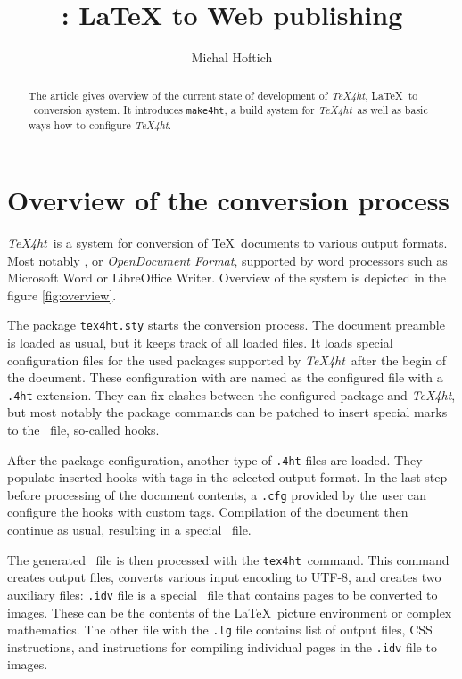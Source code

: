 \documentclass{ltugproc}
\author{Michal Hoftich}
\title{\texfourht: LaTeX to Web publishing}
\newcommand\term[1]{\textit{#1}}
\newcommand\command[1]{\texttt{#1}}
\newcommand\packagename[1]{\texttt{#1\-.sty}}
\newcommand\texfourht{\term{\TeX\-4ht}}
\newcommand\texfourhtcmd{\command{tex4ht}}
\newcommand\makefourht{\command{make4ht}}
\newcommand\extension[1]{\texttt{.#1}}
\begin{document}
\begin{abstract}
  The article gives overview of the current state of development of \texfourht,
  \LaTeX\ to \XML\ conversion system. It introduces \makefourht, a build system for
  \texfourht\ as well as basic ways how to configure \texfourht.
\end{abstract}
\maketitle

\section{Overview of the conversion process}
\texfourht\ is a system for conversion of \TeX\ documents to various output
formats. Most notably \HTML, or \term{OpenDocument Format}, supported by word processors such as Microsoft Word or LibreOffice
Writer. Overview of the system is depicted in the figure \ref{fig:overview}.


The package \packagename{tex4ht} starts the conversion process. The document
preamble is loaded as usual, but it keeps track of all loaded files. 
It loads special configuration files for the
used packages supported by \texfourht\ after the begin of the document.
These configuration with are named as the configured file with a
\extension{4ht} extension.  They can fix clashes between the configured package
and \texfourht, but most notably the package commands can be patched to insert
special marks to the \DVI\ file, so-called
hooks. 

After the package configuration, another type of \extension{4ht} files are loaded.
They populate inserted hooks with tags in the selected output format. In the
last step before processing of the document contents, a \extension{cfg}
provided by the user can configure the hooks with custom tags. Compilation of
the document then continue as usual, resulting in a special \DVI\ file.

The generated \DVI\ file is then processed with the \texfourhtcmd\ command.
This command creates output files, converts various input encoding to UTF-8,
and creates two auxiliary files: \extension{idv} file is a special \DVI\ file that contains
pages to be converted to images. These can be the contents of the \LaTeX\ picture
environment or complex mathematics. The other file with the \extension{lg}
file contains list of output files, CSS instructions, and instructions for
compiling individual pages in the  \extension{idv} file to images.
\end{document}
